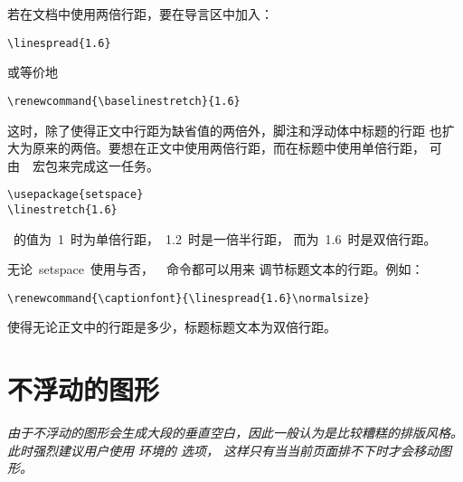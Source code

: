 若在文档中使用两倍行距，要在导言区中加入：
\begin{Verbatim}[xleftmargin=1cm]
\linespread{1.6}
\end{Verbatim}
或等价地
\begin{Verbatim}[xleftmargin=1cm]
\renewcommand{\baselinestretch}{1.6}
\end{Verbatim}
这时，除了使得正文中行距为缺省值的两倍外，脚注和浮动体中标题的行距
也扩大为原来的两倍。要想在正文中使用两倍行距，而在标题中使用单倍行距，
可由~~宏包来完成这一任务。
\begin{Verbatim}[xleftmargin=1cm]
\usepackage{setspace} 
\linestretch{1.6}
\end{Verbatim}
~的值为~1~时为单倍行距，~1.2~时是一倍半行距，
而为~1.6~时是双倍行距。

无论~\textsf{setspace}~使用与否，~~命令都可以用来
调节标题文本的行距。例如：
\begin{Verbatim}[xleftmargin=1cm]
\renewcommand{\captionfont}{\linespread{1.6}\normalsize}
\end{Verbatim}
使得无论正文中的行距是多少，标题标题文本为双倍行距。

\section{不浮动的图形}\label{sec:nonfloat}

\emph{由于不浮动的图形会生成大段的垂直空白，因此一般认为是比较糟糕的排版风格。
	此时强烈建议用户使用  环境的 \opt{[!ht]} 选项，
	这样只有当当前页面排不下时才会移动图形。}

